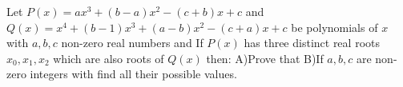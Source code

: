 Let $P(x)=ax^3+(b-a)x^2-(c+b)x+c$ and $Q(x)=x^4+(b-1)x^3+(a-b)x^2-(c+a)x+c$ be polynomials of $x$ with $a,b,c$ non-zero real numbers and If $P(x)$ has three distinct real roots $x_0,x_1,x_2$ which are also roots of $Q(x)$ then:
A)Prove that 
B)If $a,b,c$ are non-zero integers with find all their possible values.